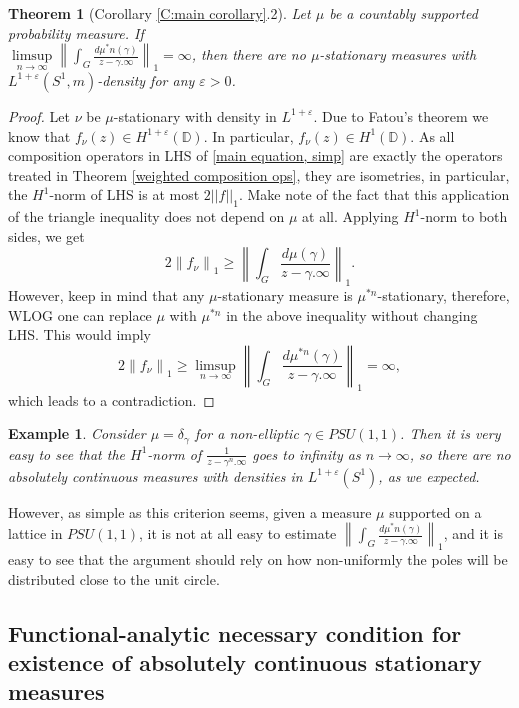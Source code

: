 \documentclass[11pt]{article}
\newtheorem{theorem}{Theorem}[section]
\newtheorem{example}{Example}[section]
\begin{document}
\begin{theorem}[Corollary \ref{C:main corollary}.2]
	Let $\mu$ be a countably supported probability measure. If \\ $\limsup\limits_{n \rightarrow \infty} \left\| \int_G \frac{d \mu^*n(\gamma)}{z - \gamma.\infty} \right\|_1 = \infty$, then there are no $\mu$-stationary measures with $L^{1+\varepsilon}(S^1, m)$-density for any $\varepsilon > 0$.
\end{theorem}
\begin{proof}
	Let $\nu$ be $\mu$-stationary with density in $L^{1+\varepsilon}$. Due to Fatou's theorem we know that $f_\nu(z) \in H^{1 + \varepsilon}(\mathbb{D})$. In particular, $f_\nu(z) \in H^1(\mathbb{D})$. As all composition operators in LHS of \eqref{main equation, simp} are exactly the operators treated in Theorem \ref{weighted composition ops}, they are isometries, in particular, the $H^1$-norm of LHS is at most $2||f||_1$. Make note of the fact that this application of the triangle inequality does not depend on $\mu$ at all. Applying $H^1$-norm to both sides, we get
	\[
	2 \left\| f_\nu \right\|_1 \ge \left\| \int_G \frac{d \mu(\gamma)}{z - \gamma.\infty} \right\|_1.
	\]
	However, keep in mind that any $\mu$-stationary measure is $\mu^{*n}$-stationary, therefore, WLOG one can replace $\mu$ with $\mu^{*n}$ in the above inequality without changing LHS. This would imply
	\[
	2 \left\| f_\nu \right\|_1 \ge \limsup\limits_{n \rightarrow \infty} \left\| \int_G \frac{d \mu^{*n}(\gamma)}{z - \gamma.\infty} \right\|_1 = \infty,
	\]
	which leads to a contradiction.
\end{proof}

\begin{example}
	Consider $\mu = \delta_\gamma$ for a non-elliptic $\gamma \in PSU(1,1)$. Then it is very easy to see that the $H^1$-norm of $\frac{1}{z - \gamma^n.\infty}$ goes to infinity as $n \rightarrow \infty$, so there are no absolutely continuous measures with densities in $L^{1 + \varepsilon}(S^1)$, as we expected.
\end{example}

However, as simple as this criterion seems, given a measure $\mu$ supported on a lattice in $PSU(1,1)$, it is not at all easy to estimate $\left\| \int_G \frac{d \mu^*n(\gamma)}{z - \gamma.\infty} \right\|_1$, and it is easy to see that the argument should rely on how non-uniformly the poles will be distributed close to the unit circle.

\subsection{Functional-analytic necessary condition for existence of absolutely continuous stationary measures}
\end{document}
